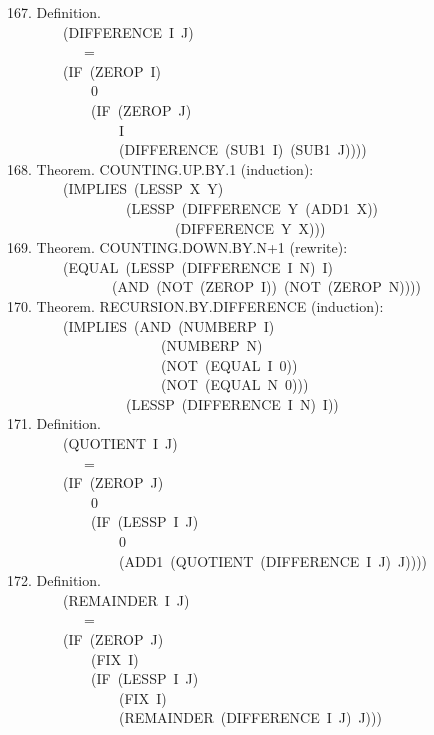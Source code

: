 \documentclass[10pt]{book}
\newenvironment{pubasis}{\begin{flushleft}}{\end{flushleft}}
\begin{document}
\begin{pubasis}
167.    Definition.\\
~~~~~~~~(DIFFERENCE~I~J)\\
~~~~~~~~~~~=\\
~~~~~~~~(IF~(ZEROP~I)\\
~~~~~~~~~~~~0\\
~~~~~~~~~~~~(IF~(ZEROP~J)\\
~~~~~~~~~~~~~~~~I\\
~~~~~~~~~~~~~~~~(DIFFERENCE~(SUB1~I)~(SUB1~J))))\\

168.    Theorem.  COUNTING.UP.BY.1 (induction):\\
~~~~~~~~(IMPLIES~(LESSP~X~Y)\\
~~~~~~~~~~~~~~~~~(LESSP~(DIFFERENCE~Y~(ADD1~X))\\
~~~~~~~~~~~~~~~~~~~~~~~~(DIFFERENCE~Y~X)))\\

169.    Theorem.  COUNTING.DOWN.BY.N+1 (rewrite):\\
~~~~~~~~(EQUAL~(LESSP~(DIFFERENCE~I~N)~I)\\
~~~~~~~~~~~~~~~(AND~(NOT~(ZEROP~I))~(NOT~(ZEROP~N))))\\

170.    Theorem.  RECURSION.BY.DIFFERENCE (induction):\\
~~~~~~~~(IMPLIES~(AND~(NUMBERP~I)\\
~~~~~~~~~~~~~~~~~~~~~~(NUMBERP~N)\\
~~~~~~~~~~~~~~~~~~~~~~(NOT~(EQUAL~I~0))\\
~~~~~~~~~~~~~~~~~~~~~~(NOT~(EQUAL~N~0)))\\
~~~~~~~~~~~~~~~~~(LESSP~(DIFFERENCE~I~N)~I))\\

171.    Definition.\\
~~~~~~~~(QUOTIENT~I~J)\\
~~~~~~~~~~~=\\
~~~~~~~~(IF~(ZEROP~J)\\
~~~~~~~~~~~~0\\
~~~~~~~~~~~~(IF~(LESSP~I~J)\\
~~~~~~~~~~~~~~~~0\\
~~~~~~~~~~~~~~~~(ADD1~(QUOTIENT~(DIFFERENCE~I~J)~J))))\\

172.    Definition.\\
~~~~~~~~(REMAINDER~I~J)\\
~~~~~~~~~~~=\\
~~~~~~~~(IF~(ZEROP~J)\\
~~~~~~~~~~~~(FIX~I)\\
~~~~~~~~~~~~(IF~(LESSP~I~J)\\
~~~~~~~~~~~~~~~~(FIX~I)\\
~~~~~~~~~~~~~~~~(REMAINDER~(DIFFERENCE~I~J)~J)))\\


\end{pubasis}
\end{document}
